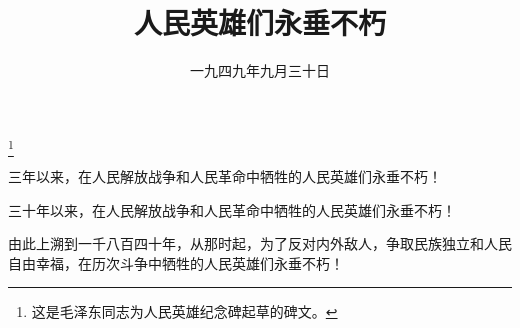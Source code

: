 
\title{人民英雄们永垂不朽}
\date{一九四九年九月三十日}
\thanks{这是毛泽东同志为人民英雄纪念碑起草的碑文。}
\maketitle


三年以来，在人民解放战争和人民革命中牺牲的人民英雄们永垂不朽！

三十年以来，在人民解放战争和人民革命中牺牲的人民英雄们永垂不朽！

由此上溯到一千八百四十年，从那时起，为了反对内外敌人，争取民族独立和人民自由幸福，在历次斗争中牺牲的人民英雄们永垂不朽！
